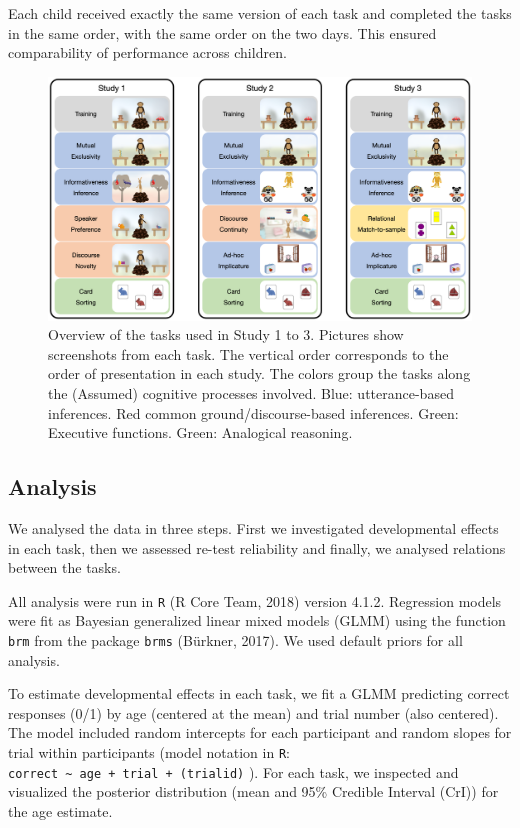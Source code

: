 \documentclass[
  english,
  man,floatsintext]{apa6}
\begin{document}
Each child received exactly the same version of each task and completed the tasks in the same order, with the same order on the two days. This ensured comparability of performance across children.



\begin{figure}

{\centering \includegraphics[width=1\linewidth]{./figures/figure1} 

}

\caption{Overview of the tasks used in Study 1 to 3. Pictures show screenshots from each task. The vertical order corresponds to the order of presentation in each study. The colors group the tasks along the (Assumed) cognitive processes involved. Blue: utterance-based inferences. Red common ground/discourse-based inferences. Green: Executive functions. Green: Analogical reasoning.}\label{fig:fig1}
\end{figure}

\hypertarget{analysis}{%
\subsection{Analysis}\label{analysis}}

We analysed the data in three steps. First we investigated developmental effects in each task, then we assessed re-test reliability and finally, we analysed relations between the tasks.

All analysis were run in \texttt{R} (R Core Team, 2018) version 4.1.2. Regression models were fit as Bayesian generalized linear mixed models (GLMM) using the function \texttt{brm} from the package \texttt{brms} (Bürkner, 2017). We used default priors for all analysis.

To estimate developmental effects in each task, we fit a GLMM predicting correct responses (0/1) by age (centered at the mean) and trial number (also centered). The model included random intercepts for each participant and random slopes for trial within participants (model notation in \texttt{R}: \texttt{correct\ \textasciitilde{}\ age\ +\ trial\ +\ (trial\textbar{}id)} ). For each task, we inspected and visualized the posterior distribution (mean and 95\% Credible Interval (CrI)) for the age estimate.
\end{document}
